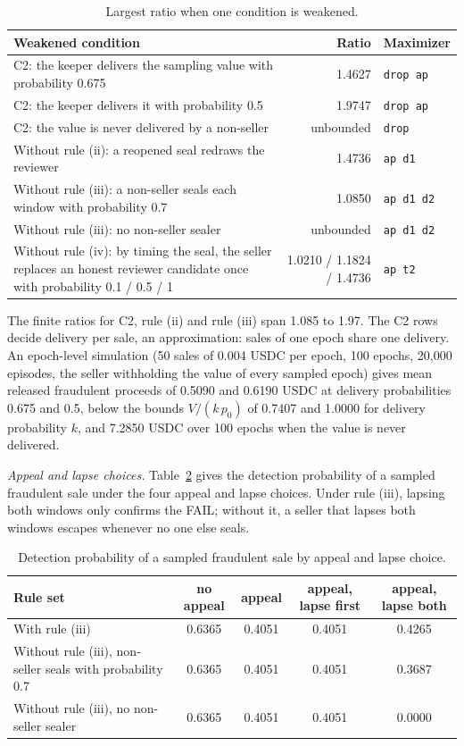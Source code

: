 \documentclass[10pt,a4paper]{article}
\theoremstyle{plain}
\theoremstyle{remark}
\begin{document}
\begin{table}[!htbp]
\centering
\caption{Largest ratio when one condition is weakened.}
\label{tab:ablate}
\footnotesize
\begin{tabular}{@{}p{9.6cm}rl@{}}
\toprule
Weakened condition & Ratio & Maximizer \\
\midrule
C2: the keeper delivers the sampling value with probability 0.675 & 1.4627 & \texttt{drop ap} \\
C2: the keeper delivers it with probability 0.5 & 1.9747 & \texttt{drop ap} \\
C2: the value is never delivered by a non-seller & unbounded & \texttt{drop} \\
Without rule (ii): a reopened seal redraws the reviewer & 1.4736 & \texttt{ap d1} \\
Without rule (iii): a non-seller seals each window with probability 0.7 & 1.0850 & \texttt{ap d1 d2} \\
Without rule (iii): no non-seller sealer & unbounded & \texttt{ap d1 d2} \\
Without rule (iv): by timing the seal, the seller replaces an honest reviewer candidate once with probability 0.1 / 0.5 / 1 & 1.0210 / 1.1824 / 1.4736 & \texttt{ap t2} \\
\bottomrule
\end{tabular}
\end{table}

The finite ratios for C2, rule (ii) and rule (iii) span 1.085 to 1.97. The C2 rows decide delivery per sale, an approximation: sales of one epoch share one delivery. An epoch-level simulation (50 sales of 0.004 USDC per epoch, 100 epochs, 20,000 episodes, the seller withholding the value of every sampled epoch) gives mean released fraudulent proceeds of 0.5090 and 0.6190 USDC at delivery probabilities 0.675 and 0.5, below the bounds $V/(k\,p_0)$ of 0.7407 and 1.0000 for delivery probability $k$, and 7.2850 USDC over 100 epochs when the value is never delivered.

\emph{Appeal and lapse choices.} Table~\ref{tab:appeal} gives the detection probability of a sampled fraudulent sale under the four appeal and lapse choices. Under rule (iii), lapsing both windows only confirms the FAIL; without it, a seller that lapses both windows escapes whenever no one else seals.

\begin{table}[!htbp]
\centering
\caption{Detection probability of a sampled fraudulent sale by appeal and lapse choice.}
\label{tab:appeal}
\small
\begin{tabular}{@{}lcccc@{}}
\toprule
Rule set & no appeal & appeal & appeal, lapse first & appeal, lapse both \\
\midrule
With rule (iii) & 0.6365 & 0.4051 & 0.4051 & 0.4265 \\
Without rule (iii), non-seller seals with probability 0.7 & 0.6365 & 0.4051 & 0.4051 & 0.3687 \\
Without rule (iii), no non-seller sealer & 0.6365 & 0.4051 & 0.4051 & 0.0000 \\
\bottomrule
\end{tabular}
\end{table}
\end{document}
